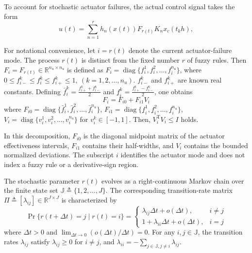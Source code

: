 \documentclass[preprint,review,fleqn,sort&compress,3p]{elsarticle}
\theoremstyle{definition} %
\theoremstyle{definition}%
\begin{document}
To account for stochastic actuator failures, the actual control signal takes the form
\begin{equation}\label{eq:local_controller}
	u(t) = \sum_{n=1}^{r} h_n(x(t)) F_{r(t)} K_{n} x_c(t_k h),
\end{equation}

For notational convenience, let $i=r(t)$ denote the current actuator-failure mode. The process $r(t)$ is distinct from the fixed number $r$ of fuzzy rules. 
Then $F_i = F_{r(t)} \in \mathbb{R}^{n_u \times n_u}$ is defined as $F_i = \operatorname{diag}\{f_{i}^1, f_{i}^2, \ldots, f_{i}^{n_u}\}$, where $0 \le f_{i-}^{k} \le f_{i}^{k} \le f_{i+}^{k} \le 1,\ (k = 1,2,\ldots,n_u)$. $f_{i-}^{k}$ and $f_{i+}^{k}$ are known real constants. 
Defining $\bar{f}_{i}^{k} = \frac{f_{i+}^{k} + f_{i-}^{k}}{2}$ and $\underline{f}_{i}^{k} = \frac{f_{i+}^{k} - f_{i-}^{k}}{2}$, one obtains
\begin{equation}\label{F_i01}
	F_{i}= F_{i0}+F_{i1} V_{i}
\end{equation}
where $F_{i0} = \operatorname{diag}\{\bar{f}_{i}^{1}, \bar{f}_{i}^{2}, \ldots, \bar{f}_{i}^{n_u}\}$, $F_{i1} = \operatorname{diag}\{\underline{f}_{i}^{1}, \underline{f}_{i}^{2}, \ldots, \underline{f}_{i}^{n_u}\}$, $V_i = \operatorname{diag}\{v_{i}^{1}, v_{i}^{2}, \ldots, v_{i}^{n_u}\}$ for $v_i^k \in [-1,1]$. Then, $V_i^\mathrm{T}V_i \le I$ holds.

In this decomposition, $F_{i0}$ is the diagonal midpoint matrix of the actuator effectiveness intervals, $F_{i1}$ contains their half-widths, and $V_i$ contains the bounded normalized deviations. The subscript $i$ identifies the actuator mode and does not index a fuzzy rule or a derivative-sign region.

The stochastic parameter $r(t)$ evolves as a right-continuous Markov chain over the finite state set $\mathbb{J} \triangleq \{1,2,\dots,J\}$. The corresponding transition-rate matrix $\Pi \triangleq [\lambda_{ij}] \in \mathbb{R}^{J \times J}$ is characterized by
\begin{equation} \label{eq:markov_jump}
	\Pr\{r(t+\Delta t) = j \mid r(t) = i\}
	=
	\begin{cases}
		\lambda_{ij}\Delta t + o(\Delta t), & i \neq j \\
		1 + \lambda_{ii}\Delta t + o(\Delta t), & i = j
	\end{cases}
\end{equation}
where $\Delta t > 0$ and $\lim_{\Delta t \to 0} (o(\Delta t) / \Delta t) = 0$. For any $i, j \in \mathbb{J}$, the transition rates $\lambda_{ij}$ satisfy $\lambda_{ij} \ge 0$ for $i \neq j$, and $\lambda_{ii} = -\sum_{j \in \mathbb{J}, j \neq i} \lambda_{ij}$.
\end{document}
